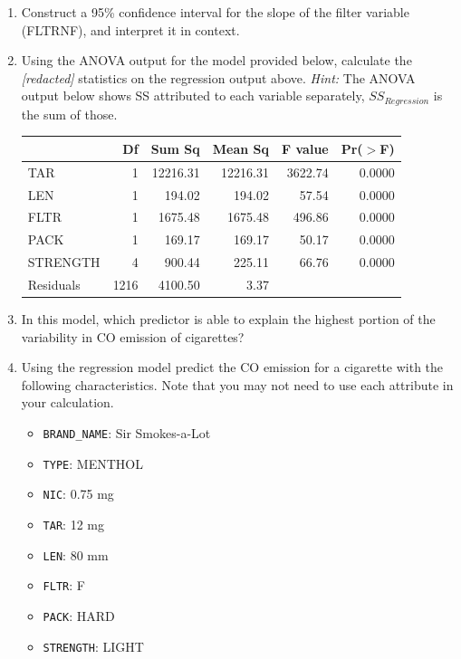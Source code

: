 \documentclass[11pt]{article}
\begin{document}
\begin{enumerate}[resume]

\item Construct a 95\% confidence interval for the slope of the filter variable (FLTRNF), and interpret it in context.

\item Using the ANOVA output for the model provided below, calculate the \textcolor{custom_blue}{\textit{[redacted]}} statistics on the regression output above. \textit{Hint:} The ANOVA output below shows SS attributed to each variable separately, $SS_{Regression}$ is the sum of those.

\begin{center}
\begin{tabular}{lrrrrr}
  \hline
 & Df & Sum Sq & Mean Sq & F value & Pr($>$F) \\ 
  \hline
TAR & 1 & 12216.31 & 12216.31 & 3622.74 & 0.0000 \\ 
  LEN & 1 & 194.02 & 194.02 & 57.54 & 0.0000 \\ 
  FLTR & 1 & 1675.48 & 1675.48 & 496.86 & 0.0000 \\ 
  PACK & 1 & 169.17 & 169.17 & 50.17 & 0.0000 \\ 
  STRENGTH & 4 & 900.44 & 225.11 & 66.76 & 0.0000 \\ 
  Residuals & 1216 & 4100.50 & 3.37 &  &  \\ 
   \hline
\end{tabular}
\end{center}

\item In this model, which predictor is able to explain the highest portion of the variability in CO emission of cigarettes?

\item Using the regression model predict the CO emission for a cigarette with the following characteristics. Note that you may not need to use each attribute in your calculation.

\begin{multicols}{2}
\begin{itemize}
\item \texttt{BRAND\_NAME}: Sir Smokes-a-Lot
\item \texttt{TYPE}: MENTHOL
\item \texttt{NIC}: 0.75 mg
\item \texttt{TAR}: 12 mg
\item \texttt{LEN}: 80 mm
\item \texttt{FLTR}: F
\item \texttt{PACK}: HARD
\item \texttt{STRENGTH}: LIGHT
\end{itemize}
\end{multicols}


\end{enumerate}
\end{document}
